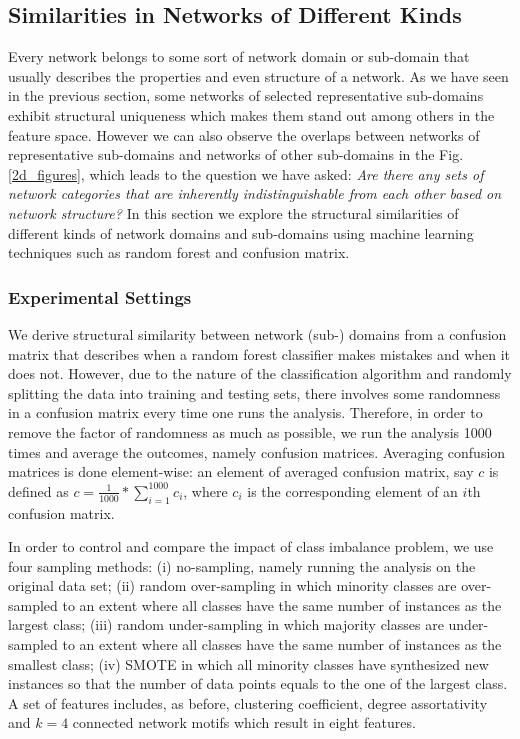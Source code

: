 \documentclass[..]{revtex4}
\begin{document}
\subsection{Similarities in Networks of Different Kinds}
Every network belongs to some sort of network domain or sub-domain that usually describes the properties and even structure of a network. As we have seen in the previous section, some networks of selected representative sub-domains exhibit structural uniqueness which makes them stand out among others in the feature space. However we can also observe the overlaps between networks of representative sub-domains and networks of other sub-domains in the Fig. \ref{2d_figures}, which leads to the question we have asked:  \textit{Are there any sets of network categories that are inherently indistinguishable from each other based on network structure?} In this section we explore the structural similarities of different kinds of network domains and sub-domains using machine learning techniques such as random forest and confusion matrix.  

\subsubsection{Experimental Settings}
We derive structural similarity between network (sub-) domains from a confusion matrix that describes when a random forest classifier makes mistakes and when it does not. However, due to the nature of the classification algorithm and randomly splitting the data into training and testing sets, there involves some randomness in a confusion matrix every time one runs the analysis. Therefore, in order to remove the factor of randomness as much as possible, we run the analysis 1000 times and average the outcomes, namely confusion matrices. Averaging confusion matrices is done element-wise: an element of averaged confusion matrix, say $c$ is defined as $c = \frac{1}{1000}*\sum_{i=1}^{1000} c_i$, where $c_i$ is the corresponding element of an $i$th confusion matrix.

In order to control and compare the impact of class imbalance problem, we use four sampling methods: (i) no-sampling, namely running the analysis on the original data set; (ii) random over-sampling in which minority classes are over-sampled to an extent where all classes have the same number of instances as the largest class; (iii) random under-sampling in which majority classes are under-sampled to an extent where all classes have the same number of instances as the smallest class; (iv) SMOTE in which all minority classes have synthesized new instances so that the number of data points equals to the one of the largest class. A set of features includes, as before, clustering coefficient, degree assortativity and $k = 4$ connected network motifs which result in eight features.
 
\end{document}
